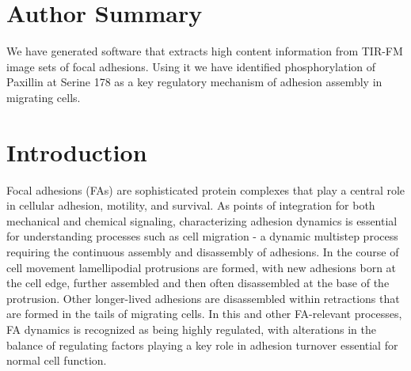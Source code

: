 \documentclass[10pt]{article}
\begin{document}

\section*{Author Summary}

We have generated software that extracts high content information from TIR-FM
image sets of focal adhesions.  Using it we have identified phosphorylation of
Paxillin at Serine 178 as a key regulatory mechanism of adhesion assembly in
migrating cells.

\section*{Introduction}

Focal adhesions (FAs) are sophisticated protein complexes that play a central
role in cellular adhesion, motility, and survival. As points of integration for
both mechanical and chemical signaling, characterizing adhesion dynamics is
essential for understanding processes such as cell migration - a dynamic
multistep process requiring the continuous assembly and disassembly of
adhesions. In the course of cell movement lamellipodial protrusions are formed,
with new adhesions born at the cell edge, further assembled and then often
disassembled at the base of the protrusion. Other longer-lived adhesions are
disassembled within retractions that are formed in the tails of migrating cells.
In this and other FA-relevant processes, FA dynamics is recognized as being
highly regulated, with alterations in the balance of regulating factors playing
a key role in adhesion turnover essential for normal cell function.
\end{document}
